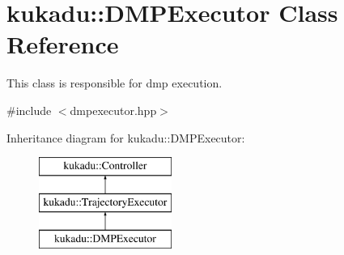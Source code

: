 \hypertarget{classkukadu_1_1DMPExecutor}{\section{kukadu\-:\-:D\-M\-P\-Executor Class Reference}
\label{classkukadu_1_1DMPExecutor}
}


This class is responsible for dmp execution.  




{\ttfamily \#include $<$dmpexecutor.\-hpp$>$}

Inheritance diagram for kukadu\-:\-:D\-M\-P\-Executor\-:\begin{figure}[H]
\begin{center}
\leavevmode
\includegraphics[height=3.000000cm]{classkukadu_1_1DMPExecutor}
\end{center}
\end{figure}
